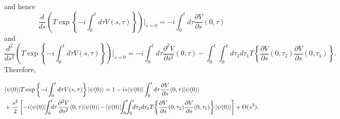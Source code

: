 and hence
\begin{equation*}
\frac{d}{ds}\left(T \exp\left\{-i\int_{0}^{t} d\tau V(s,\tau)\right\}\right)\bigg|_{s=0}=-i\int_{0}^{t} d\tau \frac{\partial V}{\partial s}(0,\tau)
\end{equation*}
and
\begin{equation*}
\frac{d^2}{ds^2}\left(T \exp\left\{-i\int_{0}^{t} d\tau V(s,\tau)\right\}\right)\bigg|_{s=0}=-i\int_{0}^{t}d\tau \frac{\partial^2V}{\partial s^2}(0,\tau)-\int_{0}^{t}\int_{0}^t d\tau_2d\tau_1T\left\{\frac{\partial V}{\partial s}(0,\tau_2)\frac{\partial V}{\partial s}(0,\tau_1)\right\}.
\end{equation*}
Therefore,


\begin{eqnarray*}
&\bra{\psi(0)}T\exp\left\{-i\int_{0}^{t} d\tau V(s,\tau)\right\} \ket{\psi(0)} = 
1-is\bra{\psi(0)}\int_{0}^{t} d\tau \frac{\partial V}{\partial s}(0,\tau)\ket{\psi(0)}\\
&+\frac{s^2}{2}\left[-i\bra{\psi(0)}\!\!\int_{0}^{t}\!\!\!d\tau \frac{\partial^2V}{\partial s^2}(0,\tau)\ket{\psi(0)}\! - \!\bra{\psi(0)}\!\!\int_{0}^{t}\!\!\!\int_{0}^t \!\!\! d\tau_2d\tau_1T\!\left\{\frac{\partial V}{\partial s}(0,\tau_2)\frac{\partial V}{\partial s}(0,\tau_1)\right\}\ket{\psi(0)}\right]
+\text{O}(s^3).
\end{eqnarray*}


